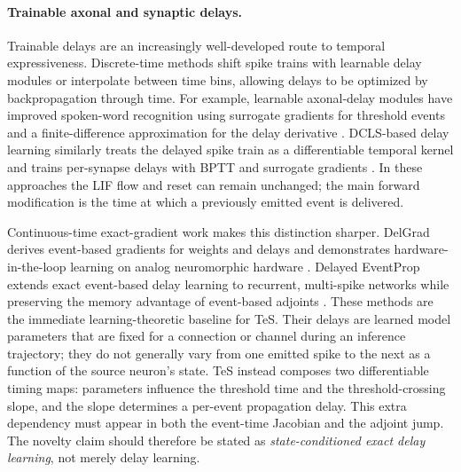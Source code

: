 \paragraph{Trainable axonal and synaptic delays.}
Trainable delays are an increasingly well-developed route to temporal expressiveness. Discrete-time methods shift spike trains with learnable delay modules or interpolate between time bins, allowing delays to be optimized by backpropagation through time. For example, learnable axonal-delay modules have improved spoken-word recognition using surrogate gradients for threshold events and a finite-difference approximation for the delay derivative \cite{sun2023learnable}. DCLS-based delay learning similarly treats the delayed spike train as a differentiable temporal kernel and trains per-synapse delays with BPTT and surrogate gradients \cite{meszaros2024delaystructure}. In these approaches the LIF flow and reset can remain unchanged; the main forward modification is the time at which a previously emitted event is delivered.

Continuous-time exact-gradient work makes this distinction sharper. DelGrad derives event-based gradients for weights and delays and demonstrates hardware-in-the-loop learning on analog neuromorphic hardware \cite{goeltz2025delgrad}. Delayed EventProp extends exact event-based delay learning to recurrent, multi-spike networks while preserving the memory advantage of event-based adjoints \cite{meszaros2025delay}. These methods are the immediate learning-theoretic baseline for TeS. Their delays are learned model parameters that are fixed for a connection or channel during an inference trajectory; they do not generally vary from one emitted spike to the next as a function of the source neuron's state. TeS instead composes two differentiable timing maps: parameters influence the threshold time and the threshold-crossing slope, and the slope determines a per-event propagation delay. This extra dependency must appear in both the event-time Jacobian and the adjoint jump. The novelty claim should therefore be stated as \emph{state-conditioned exact delay learning}, not merely delay learning.

